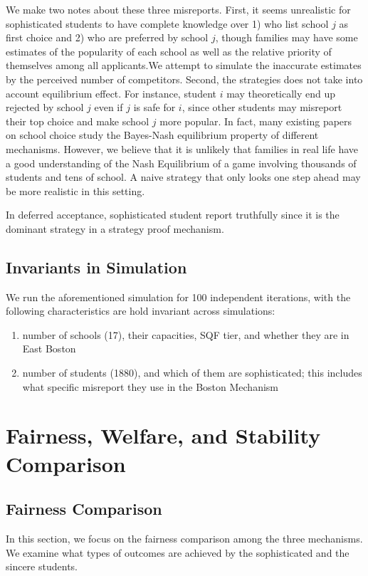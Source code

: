 \documentclass[10pt, reqno]{amsart}
\begin{document}
We make two notes about these three misreports. 
First, it seems unrealistic for sophisticated students to have complete knowledge over 1) who list school $j$ as first choice and 2) who are preferred by school $j$, though families may have some estimates of the popularity of each school as well as the relative priority of themselves among all applicants.We attempt to simulate the inaccurate estimates by the perceived number of competitors. 
Second, the strategies does not take into account equilibrium effect. For instance, student $i$ may theoretically end up rejected by school $j$ even if $j$ is safe for $i$, since other students may misreport their top choice and make school $j$ more popular. In fact, many existing papers on school choice study the Bayes-Nash equilibrium property of different mechanisms. However, we believe that it is unlikely that families in real life have a good understanding of the Nash Equilibrium of a game involving thousands of students and tens of school. A naive strategy that only looks one step ahead may be more realistic in this setting. 

In deferred acceptance, sophisticated student report truthfully since it is the dominant strategy in a strategy proof mechanism. 

\subsection{Invariants in Simulation} We run the aforementioned simulation for 100 independent iterations, with the following characteristics are hold invariant across simulations:
\begin{enumerate}
	\item number of schools (17), their capacities, SQF tier, and whether they are in East Boston
	\item number of students (1880), and which of them are sophisticated; this includes what specific misreport they use in the Boston Mechanism
\end{enumerate}

\section{Fairness, Welfare, and Stability Comparison}

\subsection{Fairness Comparison}
In this section, we focus on the fairness comparison among the three mechanisms. We examine what types of outcomes are achieved by the sophisticated and the sincere students. 
\end{document}

